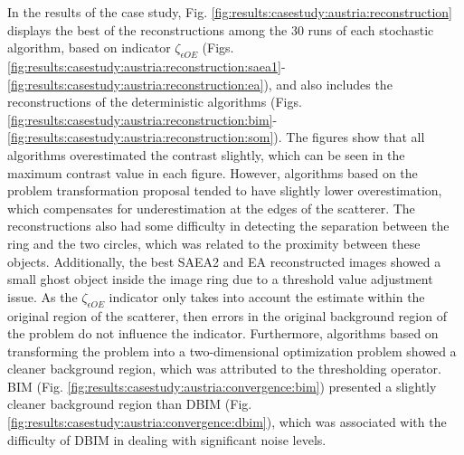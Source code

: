 			In the results of the case study, Fig. \ref{fig:results:casestudy:austria:reconstruction} displays the best of the reconstructions among the 30 runs of each stochastic algorithm, based on indicator $\zeta_{\epsilon OE}$ (Figs. \ref{fig:results:casestudy:austria:reconstruction:saea1}-\ref{fig:results:casestudy:austria:reconstruction:ea}), and also includes the reconstructions of the deterministic algorithms (Figs. \ref{fig:results:casestudy:austria:reconstruction:bim}-\ref{fig:results:casestudy:austria:reconstruction:som}). The figures show that all algorithms overestimated the contrast slightly, which can be seen in the maximum contrast value in each figure. However, algorithms based on the problem transformation proposal tended to have slightly lower overestimation, which compensates for underestimation at the edges of the scatterer. The reconstructions also had some difficulty in detecting the separation between the ring and the two circles, which was related to the proximity between these objects. Additionally, the best SAEA2 and EA reconstructed images showed a small ghost object inside the image ring due to a threshold value adjustment issue. As the $\zeta_{\epsilon OE}$ indicator only takes into account the estimate within the original region of the scatterer, then errors in the original background region of the problem do not influence the indicator. Furthermore, algorithms based on transforming the problem into a two-dimensional optimization problem showed a cleaner background region, which was attributed to the thresholding operator. BIM (Fig. \ref{fig:results:casestudy:austria:convergence:bim}) presented a slightly cleaner background region than DBIM (Fig. \ref{fig:results:casestudy:austria:convergence:dbim}), which was associated with the difficulty of DBIM in dealing with significant noise levels.
		
